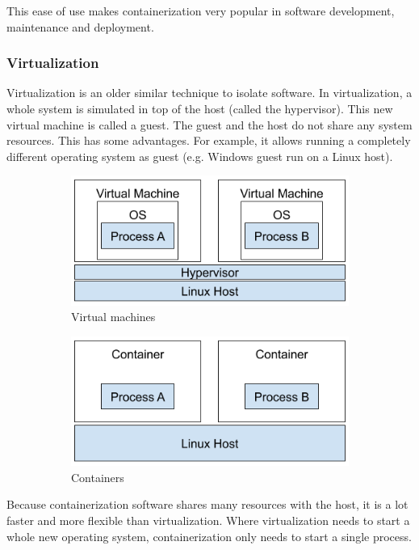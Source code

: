 \hfill

This ease of use makes containerization very popular in software development, maintenance and deployment.

\pagebreak

\subsubsection{Virtualization}
Virtualization is an older similar technique to isolate software. In virtualization, a whole system is simulated in top of the host (called the hypervisor). This new virtual machine is called a guest. The guest and the host do not share any system resources. This has some advantages. For example, it allows running a completely different operating system as guest (e.g. Windows guest run on a Linux host).

\begin{figure}[ht]
    \begin{subfigure}{.45\textwidth}
        \centering
        \includegraphics[width=.8\linewidth]{resources/images/virtual-machines.png}
        \caption{Virtual machines}
    \end{subfigure}
    \begin{subfigure}{.45\textwidth}
        \centering
        \includegraphics[width=.8\linewidth]{resources/images/containers.png}
        \caption{Containers}
    \end{subfigure}
    \caption{}
\end{figure}

Because containerization software shares many resources with the host, it is a lot faster and more flexible than virtualization. Where virtualization needs to start a whole new operating system, containerization only needs to start a single process.

